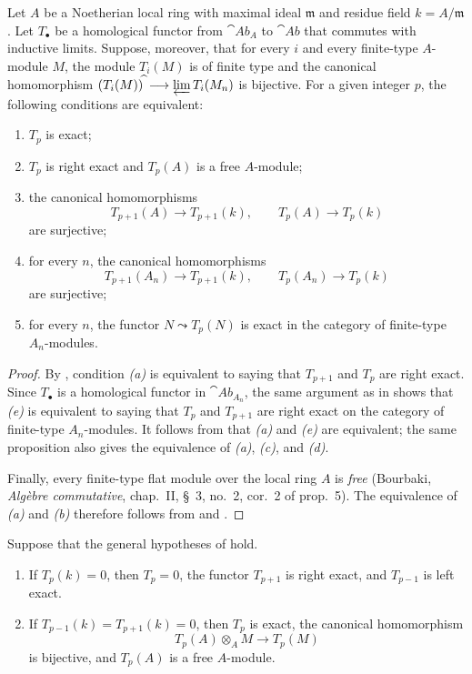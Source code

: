 \begin{proposition}[7.5.4]
\label{III.7.5.4}
Let $A$ be a Noetherian local ring with maximal ideal
$\mathfrak m$ and residue field $k=A/\mathfrak m$.  Let
$T_\bullet$ be a homological functor from $\cat{Ab}_A$ to
$\cat{Ab}$ that commutes with inductive limits.  Suppose,
moreover, that for every $i$ and every finite-type $A$-module
$M$, the module $T_i(M)$ is of finite type and the canonical
homomorphism $(T_i(M))^{\widehat{\,}}\longrightarrow\varprojlim T_i(M_n)$
is bijective.  For a given integer $p$, the following
conditions are equivalent:
\begin{enumerate}
  \item[(a)] $T_p$ is exact;
  \item[(b)] $T_p$ is right exact and $T_p(A)$ is a free
    $A$-module;
  \item[(c)] the canonical homomorphisms
    \[
      T_{p+1}(A)\longrightarrow T_{p+1}(k),
      \qquad
      T_p(A)\longrightarrow T_p(k)
    \]
    are surjective;
  \item[(d)] for every $n$, the canonical homomorphisms
    \[
      T_{p+1}(A_n)\longrightarrow T_{p+1}(k),
      \qquad
      T_p(A_n)\longrightarrow T_p(k)
    \]
    are surjective;
  \item[(e)] for every $n$, the functor $N\leadsto T_p(N)$ is
    exact in the category of finite-type $A_n$-modules.
\end{enumerate}
\end{proposition}

\begin{proof}
By , condition \emph{(a)} is equivalent to saying
that $T_{p+1}$ and $T_p$ are right exact.  Since
$T_\bullet$ is a homological functor in $\cat{Ab}_{A_n}$, the
same argument as in  shows that \emph{(e)} is
equivalent to saying that $T_p$ and $T_{p+1}$ are right exact
on the category of finite-type $A_n$-modules.  It follows from
 that \emph{(a)} and \emph{(e)} are equivalent; the same
proposition also gives the equivalence of \emph{(a)}, \emph{(c)}, and \emph{(d)}.

Finally, every finite-type flat module over the local ring
$A$ is \emph{free} (Bourbaki, \emph{Alg\`ebre commutative},
chap.~II, \S~3, no.~2, cor.~2 of prop.~5).  The equivalence
of \emph{(a)} and \emph{(b)} therefore follows from  and
.
\end{proof}

\begin{corollary}[7.5.5]
\label{III.7.5.5}
Suppose that the general hypotheses of  hold.
\begin{enumerate}
  \item[\textup{(i)}] If $T_p(k)=0$, then $T_p=0$, the functor
    $T_{p+1}$ is right exact, and $T_{p-1}$ is left exact.
  \item[\textup{(ii)}] If $T_{p-1}(k)=T_{p+1}(k)=0$, then $T_p$ is
    exact, the canonical homomorphism
    \[
      T_p(A)\otimes_A M
      \longrightarrow
      T_p(M)
    \]
    is bijective, and $T_p(A)$ is a free $A$-module.
\end{enumerate}
\end{corollary}

